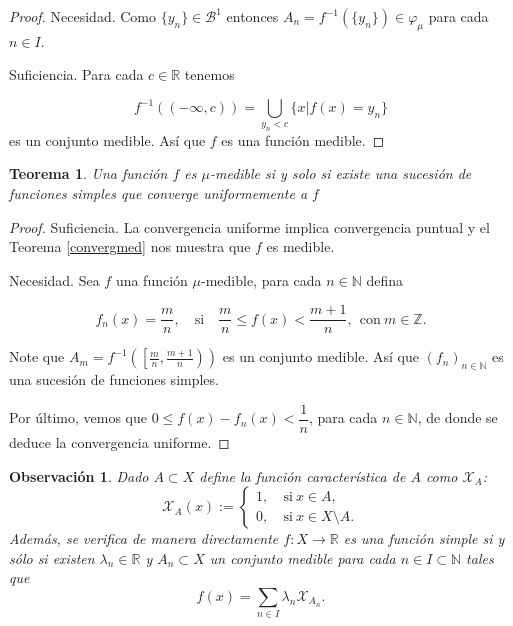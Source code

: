 \documentclass[twoside,12pt,a4 paper,openright]{book}
\newtheorem{teo}[claim]{Teorema}
\newtheorem{ob}[claim]{Observaci\'on}
\begin{document}
\begin{proof}
    Necesidad. 
     Como $\{y_n\}\in \mathcal{B}^1$ entonces $A_n = f^{-1}(\{y_n\})\in \varphi_\mu$ para cada $n\in I$. 
     
     \noindent 
     Suficiencia. Para cada $c\in \mathbb{R}$ tenemos

    $$f^{-1}((-\infty,c)) = \bigcup_{y_n<c}\{x|f(x)=y_n\}$$
  es un conjunto medible. As\'i que $f$ es una funci\'on medible.
\end{proof}
\begin{teo}
    Una funci\'on $f$ es $\mu$-medible si y solo si existe una sucesi\'on de funciones simples que converge uniformemente a $f$
\end{teo}
\begin{proof}

    Suficiencia. La convergencia uniforme implica convergencia puntual y el Teorema \ref{convergmed} nos muestra que $f$ es medible.
    
    
    \noindent 
  Necesidad.  Sea $f$ una funci\'on $\mu$-medible, para cada $n\in\mathbb{N}$ defina

    $$f_n(x) = \frac{m}{n} , \quad \text{si} \quad \frac{m}{n}\leq f(x)< \frac{m + 1}{n}, \ \ \text{con} \ m\in \mathbb Z.$$

    Note que $\displaystyle A_ {m}= f^{-1}\left(\left[\frac{m}{n}, \frac{m + 1}{n}\right)\right)$    es  un conjunto medible. As\'i que $(f_n)_{n\in\mathbb N}$ es una sucesi\'on de funciones simples. 
    
     
    
    Por \'ultimo, vemos que $0 \leq f(x)- f_n(x)< \dfrac{1}{n} $, para cada $n\in \mathbb{N}$, de donde se deduce la convergencia uniforme.
    
\end{proof}


\begin{ob}
Dado $A\subset X$ define la funci\'on caracter\'istica de $A$ como  $\mathcal X_A$:
$$\mathcal X _A(x ) :=\left\{ \begin{array}{ll} 1, & \  \text{si} \ x\in A , \\  0, & \  \text{si} \ x\in X\setminus A.  \end{array} \right.$$
Adem\'as, se verifica de manera directamente   $f:X\to \mathbb R$ es una funci\'on simple si y s\'olo si existen $ \lambda_n \in \mathbb R  $   
  y $A_n\subset X$ un conjunto medible para cada $n\in I\subset \mathbb N$ tales que  
  $$ f(x) = \sum_{n\in I}  \lambda_n \mathcal X _{A_n}.$$
\end{ob}
\end{document}
